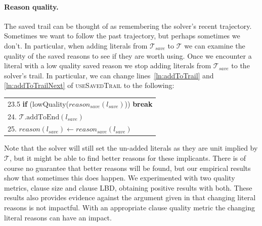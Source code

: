\documentclass[runningheads]{llncs}
\newcommand{\trail}{\ensuremath{\mathcal{T}}}
\newcommand{\reason}[1]{\ensuremath{\mathit{reason}(#1)}}
\newcommand{\reasonsave}[1]{\ensuremath{\mathit{reason_{\mathit{save}}(#1)}}}
\newcommand{\litsave}{\ensuremath{\mathit{l_{\mathit{save}}}}}
\newcommand{\trailsave}{\trail_{\mathit{save}}}
\newcommand{\ust}{\textsc{useSavedTrail}\xspace}
\begin{document}
\paragraph{Reason quality.}
The saved trail can be thought of as remembering the solver's recent
trajectory. Sometimes we want to follow the past trajectory, but
perhaps sometimes we don't. In particular, when adding literals from
$\trailsave{}$ to $\trail$ we can examine the quality of the saved
reasons to see if they are worth using. Once we encounter a literal
with a low quality saved reason we stop adding literals from
$\trailsave$ to the solver's trail. In particular, we can change
lines~\ref{ln:addToTrail} and \ref{ln:addToTrailNext} of \ust
to the following:\\
\begin{tabular}[t]{l}
23.5 \qquad \textbf{if} (lowQuality($\reasonsave{\litsave}$)) \textbf{break}\\
24.  \qquad $\trail.\mathrm{addToEnd(\litsave)}$\\
25.  \qquad $\reason{\litsave}\gets \reasonsave{\litsave}$
\end{tabular}

Note that the solver will still set the un-added literals as they are
unit implied by $\trail$, but it might be able to find better reasons
for these implicants. There is of course no guarantee that better
reasons will be found, but our empirical results show that sometimes
this does happen. We experimented with two quality metrics, clause
size and clause LBD, obtaining positive results with both. These
results also provides evidence against the argument given in
\cite{DBLP:journals/jsat/TakRH11} that changing literal reasons is not
impactful. With an appropriate clause quality metric the changing literal
reasons can have an impact.

\end{document}
